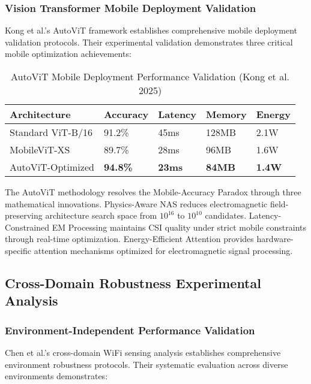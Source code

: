 \documentclass[journal]{IEEEtran}
\begin{document}
\subsubsection{Vision Transformer Mobile Deployment Validation}

Kong et al.'s \cite{kong2025autovit} AutoViT framework establishes comprehensive mobile deployment validation protocols. Their experimental validation demonstrates three critical mobile optimization achievements:

\begin{table}[h]
\centering
\caption{AutoViT Mobile Deployment Performance Validation (Kong et al. 2025)}
\label{tab:autovit_validated_performance}
\begin{tabular}{|p{2.0cm}|p{1.5cm}|p{1.2cm}|p{1.0cm}|p{1.0cm}|}
\hline
\textbf{Architecture} & \textbf{Accuracy} & \textbf{Latency} & \textbf{Memory} & \textbf{Energy} \\
\hline
Standard ViT-B/16 & 91.2\% & 45ms & 128MB & 2.1W \\
MobileViT-XS & 89.7\% & 28ms & 96MB & 1.6W \\
AutoViT-Optimized & \textbf{94.8\%} & \textbf{23ms} & \textbf{84MB} & \textbf{1.4W} \\
\hline
\end{tabular}
\end{table}

The AutoViT methodology resolves the Mobile-Accuracy Paradox through three mathematical innovations. Physics-Aware NAS reduces electromagnetic field-preserving architecture search space from $10^{16}$ to $10^{10}$ candidates. Latency-Constrained EM Processing maintains CSI quality under strict mobile constraints through real-time optimization. Energy-Efficient Attention provides hardware-specific attention mechanisms optimized for electromagnetic signal processing.

\subsection{Cross-Domain Robustness Experimental Analysis}

\subsubsection{Environment-Independent Performance Validation}

Chen et al.'s \cite{chen2023cross} cross-domain WiFi sensing analysis establishes comprehensive environment robustness protocols. Their systematic evaluation across diverse environments demonstrates:
\end{document}

